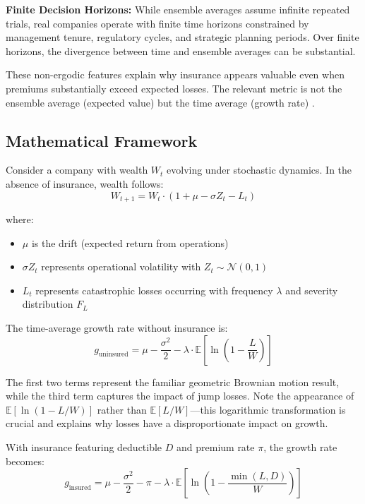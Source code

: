 \documentclass[11pt,letterpaper]{article}
\newcommand{\E}{\mathbb{E}}
\begin{document}
\textbf{Finite Decision Horizons:} While ensemble averages assume infinite repeated trials, real companies operate with finite time horizons constrained by management tenure, regulatory cycles, and strategic planning periods. Over finite horizons, the divergence between time and ensemble averages can be substantial.

These non-ergodic features explain why insurance appears valuable even when premiums substantially exceed expected losses. The relevant metric is not the ensemble average (expected value) but the time average (growth rate) \citep{peters2011time}.

\subsection{Mathematical Framework}

Consider a company with wealth $W_t$ evolving under stochastic dynamics. In the absence of insurance, wealth follows:
\begin{equation}
W_{t+1} = W_t \cdot \left(1 + \mu - \sigma Z_t - L_t\right)
\end{equation}

where:
\begin{itemize}
    \item $\mu$ is the drift (expected return from operations)
    \item $\sigma Z_t$ represents operational volatility with $Z_t \sim \mathcal{N}(0,1)$
    \item $L_t$ represents catastrophic losses occurring with frequency $\lambda$ and severity distribution $F_L$
\end{itemize}

The time-average growth rate without insurance is:
\begin{equation}
g_{\text{uninsured}} = \mu - \frac{\sigma^2}{2} - \lambda \cdot \E\left[\ln\left(1 - \frac{L}{W}\right)\right]
\end{equation}

The first two terms represent the familiar geometric Brownian motion result, while the third term captures the impact of jump losses. Note the appearance of $\E[\ln(1 - L/W)]$ rather than $\E[L/W]$—this logarithmic transformation is crucial and explains why losses have a disproportionate impact on growth.

With insurance featuring deductible $D$ and premium rate $\pi$, the growth rate becomes:
\begin{equation}
g_{\text{insured}} = \mu - \frac{\sigma^2}{2} - \pi - \lambda \cdot \E\left[\ln\left(1 - \frac{\min(L, D)}{W}\right)\right]
\end{equation}
\end{document}
